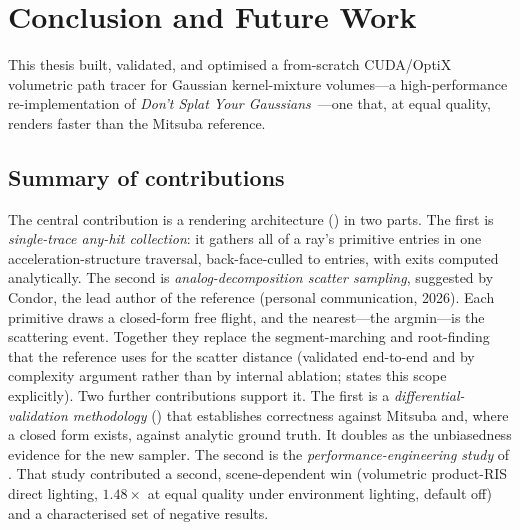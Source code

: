 \chapter{Conclusion and Future Work}
\label{ch:conclusion}

This thesis built, validated, and optimised a from-scratch CUDA/OptiX volumetric path tracer for
Gaussian kernel-mixture volumes---a high-performance re-implementation of \emph{Don't Splat Your
Gaussians}~\cite{DSYG}---one that, at equal quality, renders faster than the Mitsuba reference.

\section{Summary of contributions}
\label{sec:contributions}

The central contribution is a rendering architecture () in two
parts. The first is \emph{single-trace any-hit collection}: it gathers all of a
ray's primitive entries in one acceleration-structure traversal, back-face-culled to entries, with
exits computed analytically. The second is \emph{analog-decomposition scatter sampling}, suggested by Condor, the lead author of the reference (personal communication, 2026). Each primitive draws a
closed-form free flight, and the nearest---the argmin---is the scattering event. Together they replace
the segment-marching and root-finding that the reference uses for the scatter
distance (validated end-to-end and by complexity argument rather than by internal ablation;
 states this scope explicitly). Two further contributions support it. The
first is a \emph{differential-validation methodology}
() that establishes correctness against Mitsuba and, where a closed form exists,
against analytic ground truth. It doubles as the unbiasedness evidence for the new sampler. The second is the \emph{performance-engineering study} of . That study
contributed a second, scene-dependent win (volumetric product-RIS direct lighting,
$1.48\times$ at equal quality under environment lighting, default off) and a characterised
set of negative results.

